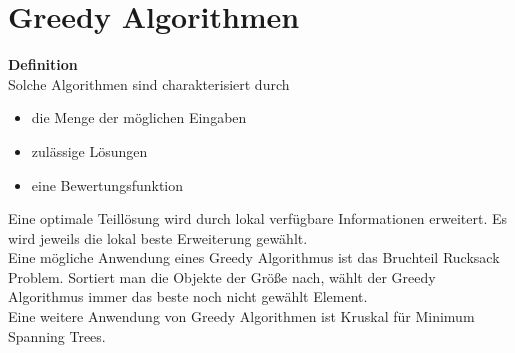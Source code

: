 \documentclass[a4paper, 12pt]{article}
\begin{document}
	\section{Greedy Algorithmen}
	\textbf{Definition}\\
	Solche Algorithmen sind charakterisiert durch \begin{itemize}
		\item die Menge der möglichen Eingaben
		\item zulässige Lösungen
		\item eine Bewertungsfunktion
	\end{itemize}  
	Eine optimale Teillösung wird durch lokal verfügbare Informationen erweitert. Es wird jeweils die lokal beste Erweiterung gewählt.\\
	
	Eine mögliche Anwendung eines Greedy Algorithmus ist das Bruchteil Rucksack Problem. Sortiert man die Objekte der Größe nach, wählt der Greedy Algorithmus immer das beste noch nicht gewählt Element.\\
	Eine weitere Anwendung von Greedy Algorithmen ist Kruskal für Minimum Spanning Trees.
\end{document}

